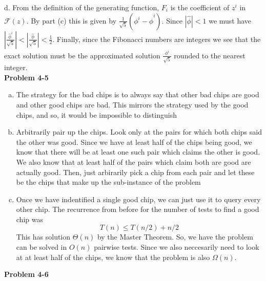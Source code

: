 \documentclass{article}
\begin{document}
d. From the definition of the generating function, $F_i$ is the coefficient of $z^i$ in $\mathcal{F}(z)$.  By part (c) this is given by $\frac{1}{\sqrt{5}} (\phi^i - \hat{\phi}^i)$. Since $|\hat{\phi}| < 1$ we must have $| \frac{\hat{\phi}^i}{\sqrt{5}} | < | \frac{\hat{\phi}}{\sqrt{5}} | < \frac{1}{2}$.  Finally, since the Fibonacci numbers are integers we see that the exact solution must be the approximated solution $\frac{\phi^i}{\sqrt{5}}$ rounded to the nearest integer. \\

\noindent\textbf{Problem 4-5}\\

\begin{enumerate}[a)]

\item
The strategy for the bad chips is to always say that other bad chips are good and other good chips are bad. This mirrors the strategy used by the good chips, and so, it would be impossible to distinguish

\item
Arbitrarily pair up the chips. Look only at the pairs for which both chips said the other was good. Since we have at least half of the chips being good, we know that there will be at least one such pair which claims the other is good. We also know that at least half of the pairs which claim both are good are actually good. Then, just arbirarily pick a chip from each pair and let these be the chips that make up the sub-instance of the problem

\item
Once we have indentified a single good chip, we can just use it to query every other chip. 
The recurrence from before for the number of tests to find a good chip was
\[
T(n) \le T(n/2) + n/2
\]
This has solution $\Theta(n)$ by the Master Theorem. So, we have the problem can be solved in $O(n)$ pairwise tests. Since we also neccesarily need to look at at least half of the chips, we know that the problem is also $\Omega(n)$.

\end{enumerate}

\noindent\textbf{Problem 4-6}\\
\end{document}
